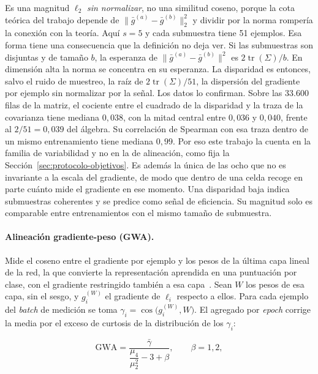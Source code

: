 Es una magnitud $\ell_2$ \emph{sin normalizar}, no una similitud coseno, porque la cota teórica del trabajo depende de $\|\bar{g}^{(a)} - \bar{g}^{(b)}\|_2^2$ y dividir por la norma rompería la conexión con la teoría. Aquí $s = 5$ y cada submuestra tiene 51 ejemplos. Esa forma tiene una consecuencia que la definición no deja ver. Si las submuestras son disjuntas y de tamaño $b$, la esperanza de $\|\bar{g}^{(a)} - \bar{g}^{(b)}\|^2$ es $2\operatorname{tr}(\Sigma)/b$. En dimensión alta la norma se concentra en su esperanza. La disparidad es entonces, salvo el ruido de muestreo, la raíz de $2\operatorname{tr}(\Sigma)/51$, la dispersión del gradiente por ejemplo sin normalizar por la señal. Los datos lo confirman. Sobre las 33.600 filas de la matriz, el cociente entre el cuadrado de la disparidad y la traza de la covarianza tiene mediana $0{,}038$, con la mitad central entre $0{,}036$ y $0{,}040$, frente al $2/51 = 0{,}039$ del álgebra. Su correlación de Spearman con esa traza dentro de un mismo entrenamiento tiene mediana $0{,}99$. Por eso este trabajo la cuenta en la familia de variabilidad y no en la de alineación, como fija la Sección~\ref{sec:protocolo-objetivos}. Es además la única de las ocho que no es invariante a la escala del gradiente, de modo que dentro de una celda recoge en parte cuánto mide el gradiente en ese momento. Una disparidad baja indica submuestras coherentes y se predice como señal de eficiencia. Su magnitud solo es comparable entre entrenamientos con el mismo tamaño de submuestra.

\paragraph{Alineación gradiente-peso (GWA).} Mide el coseno entre el gradiente por ejemplo
y los pesos de la última capa lineal de la red, la que convierte la representación aprendida en una puntuación por clase, con el gradiente restringido también a esa capa~\cite{hoelzl2025gradient}. Sean $W$ los pesos de esa capa, sin el sesgo, y $g_i^{(W)}$ el gradiente de $\ell_i$ respecto a ellos. Para cada ejemplo del \emph{batch} de medición se toma $\gamma_i = \cos\!\big(g_i^{(W)}, W\big)$. El agregado por \emph{epoch} corrige la media por el exceso de curtosis de la distribución de los $\gamma_i$:

\begin{equation}
\mathrm{GWA} = \frac{\bar{\gamma}}{\dfrac{\mu_4}{\mu_2^{2}} - 3 + \beta},
\qquad \beta = 1{,}2,
\label{eq:gwa}
\end{equation}

